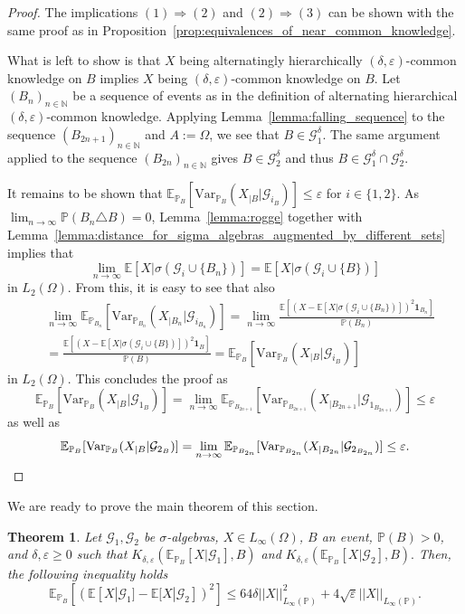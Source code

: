 \documentclass[a4paper, 10pt]{article}
\newtheorem{theorem}{Theorem}
\numberwithin{theorem}{section}
\theoremstyle{definition}
\newcommand{\N}{\mathbb{N}}
\newcommand{\E}{\mathbb{E}}
\newcommand{\G}{\mathcal{G}}
\newcommand{\ind}[1]{\mathbf{1}_{#1}}
\newcommand{\Var}{\mathrm{Var}}
\renewcommand{\epsilon}{\varepsilon}
\renewcommand{\P}{\mathbb{P}}
\begin{document}
\begin{proof}
    The implications $(1) \Rightarrow (2)$ and  $(2)  \Rightarrow (3)$ can be shown with the  same  proof as in Proposition~\ref{prop:equivalences_of_near_common_knowledge}.
    
    What is left to show is that $X$ being alternatingly hierarchically $(\delta, \epsilon)$-common knowledge on $B$ implies  $X$ being $(\delta, \epsilon)$-common knowledge on $B$. Let $(B_n)_{n\in \N}$ be a sequence of events as in the definition of alternating hierarchical $(\delta,\epsilon)$-common knowledge. Applying Lemma~\ref{lemma:falling_sequence} to the sequence $(B_{2n+1})_{n\in \N}$ and $A:=\Omega$, we see that $B \in \G_1^\delta$. The same argument applied to the sequence $(B_{2n})_{n\in \N}$ gives $B \in \G_2^\delta$ and thus $B \in \G_1^\delta \cap \G_2^\delta.$    

It remains to be shown that $\E_{\P_B}[\Var_{\P_B}(X_{|B}|\G_{i_{B}})] \leq \epsilon$ for $i \in \{1,2\}$. As $\lim_{n\to \infty} \P(B_n \triangle B) =0$, Lemma~\ref{lemma:rogge} together with Lemma~\ref{lemma:distance_for_sigma_algebras_augmented_by_different_sets} implies that
$$
\lim_{n\to \infty} \E[X | \sigma(\G_i \cup \{B_n\})]= \E[X|\sigma(\G_i \cup \{B\})]
$$
in $L_2(\Omega)$. From this, it is easy to see that also
\begin{align*}
&\lim_{n \to \infty} \E_{\P_{B_{n}}}[\Var_{\P_{B_{n}}}(X_{|B_{n}}|\G_{i_{B_n}})]=\lim_{n \to \infty} \frac{\E[(X-\E[X|\sigma(\G_i \cup \{B_n\})])^2\ind{B_n}]}{\P(B_n)}
\\
&=\frac{\E[(X-\E[X|\sigma(\G_i \cup \{B\})])^2\ind{B}]}{\P(B)}= \E_{\P_{B}}[\Var_{\P_{B}}(X_{|B}|\G_{i_{B}})]
\end{align*}
in $L_2(\Omega)$.
This concludes the proof as 
 $$ \E_{\P_B}[\Var_{\P_B}(X_{|B}|\G_{1_{B}})] = \lim_{n\to \infty} \E_{\P_{B_{2n+1}}}[\Var_{\P_{B_{2n+1}}}(X_{|B_{2n+1}}|\G_{1_{B_{2n+1}}})] \leq \epsilon  $$
    as well as
     \[ \E_{\P_B}[\Var_{\P_B}(X_{|B}|\G_{2_{B}})] = \lim_{n\to \infty} \E_{\P_{B_{2n}}}[\Var_{\P_{B_{2n}}}(X_{|B_{2n}}|\G_{2_{B_{2n}}})] \leq \epsilon. \qedhere \]
\end{proof}

We are ready to prove the main theorem of this section.

\begin{theorem}\label{theo:localaumann}
	Let $\G_1,\G_2$ be $\sigma$-algebras, $X\in  L_\infty(\Omega)$,  $B$ an event, $\P(B)>0$, and $\delta,\epsilon \geq 0$ such that $K_{\delta,\epsilon}(\E_{\P_B}[X|\G_1], B)$ and $K_{\delta,\epsilon}(\E_{\P_B}[X|\G_2], B).$ Then, the following inequality holds
	$$\E_{\P_B}[(\E[X|\G_1]-\E[X|\G_2])^2] \leq  64 \delta ||X||_{L_\infty(\P)}^2 +4 \sqrt{\epsilon} ||X||_{L_\infty(\P)}.$$
\end{theorem}
\end{document}
